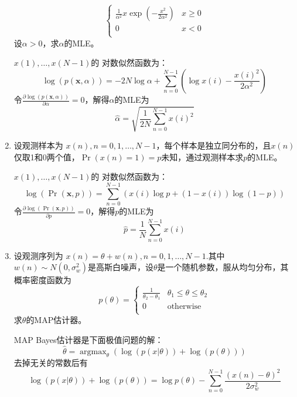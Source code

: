 \documentclass{article}
\DeclareMathOperator*{\rgmax}{argmax}
\begin{document}
\begin{enumerate}
$$\begin{cases}
\frac{1}{\alpha^2}x\exp(-\frac{x^2}{2\alpha^2}) & x\geq 0 \\
0 & x<0 \\
\end{cases}
$$
设$\alpha>0$，求$\alpha$的MLE。
\begin{solution}
$x(1),\dots,x(N-1)$的
对数似然函数为：
\begin{equation}
\log(p(\bm{x},\alpha))=-2N\log\alpha+\sum_{n=0}^{N-1}\left(\log x(i) - \frac{x(i)^2}{2\alpha^2}\right)
\end{equation}
令$\frac{\partial \log(p(\bm{x},\alpha))}{\partial \alpha}=0$，解得$\alpha$的MLE为
\begin{equation}
\hat{\alpha}=\sqrt{\frac{1}{2N}\displaystyle\sum_{n=0}^{N-1}x(i)^2}
\end{equation}
\end{solution}
\item
设观测样本为 $x(n),n=0,1,\dots,N-1$，每个样本是独立同分布的，且$x(n)$仅取1和0两个值，$\Pr(x(n)=1)=p$未知，通过观测样本求$p$的MLE。
\begin{solution}
$x(1),\dots,x(N-1)$的
对数似然函数为：
\begin{equation}
\log(\Pr(\bm{x},p))=\sum_{n=0}^{N-1} \left(x(i)\log p + (1-x(i))\log(1-p) \right)
\end{equation}
令$\frac{\partial \log(\Pr(\bm{x},p))}{\partial p}=0$，解得$p$的MLE为
\begin{equation}
\hat{p}=\frac{1}{N}\sum_{n=0}^{N-1}x(i)
\end{equation}
\end{solution}
\item
设观测序列为 $x(n) = \theta + w(n),n=0,1,\dots,N-1.$其中$w(n)\sim N(0,\sigma_w^2)$是高斯白噪声，设$\theta$是一个随机参数，服从均匀分布，其概率密度函数为
$$
p(\theta) = \begin{cases}
\frac{1}{\theta_2-\theta_1}  & \theta_1 \leq \theta \leq \theta_2 \\
0 & \textrm{otherwise}\\
\end{cases}
$$
求$\theta $的MAP估计器。
\begin{solution}
MAP Bayes估计器是下面极值问题的解：
\begin{equation}
\hat{\theta}=\rgmax_{\theta} \left(\log(p(x|\theta))+\log(p(\theta))\right)
\end{equation}
去掉无关的常数后有
\begin{equation}
\log(p(x|\theta))+\log(p(\theta))=\log p(\theta)-\sum_{n=0}^{N-1} \frac{(x(n)-\theta)^2}{2\sigma_w^2}
\end{equation}

\end{solution}
\end{enumerate}
\end{document}
